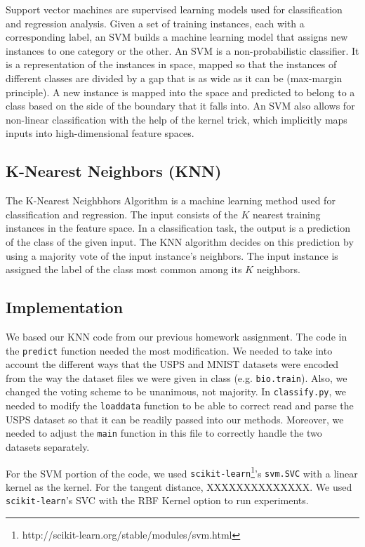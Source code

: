 \documentclass[11pt,letterpaper]{article}
\begin{document}
Support vector machines are supervised learning models used for classification and regression analysis. Given a set of training instances, each with a corresponding label, an SVM builds a machine learning model that assigns new instances to one category or the other. An SVM is a non-probabilistic classifier. It is a representation of the instances in space, mapped so that the instances of different classes are divided by a gap that is as wide as it can be (max-margin principle). A new instance is mapped into the space and predicted to belong to a class based on the side of the boundary that it falls into. An SVM also allows for non-linear classification with the help of the kernel trick, which implicitly maps inputs into high-dimensional feature spaces. 

\subsection{K-Nearest Neighbors (KNN)}

The K-Nearest Neighbhors Algorithm is a machine learning method used for classification and regression. The input consists of the $K$ nearest training instances in the feature space. In a classification task, the output is a prediction of the class of the given input. The KNN algorithm decides on this prediction by using a majority vote of the input instance's neighbors. The input instance is assigned the label of the class most common among its $K$ neighbors.

\subsection{Implementation}

We based our KNN code from our previous homework assignment. The code in the {\tt predict} function needed the most modification. We needed to take into account the different ways that the USPS and MNIST datasets were encoded from the way the dataset files we were given in class (e.g. {\tt bio.train}). Also, we changed the voting scheme to be unanimous, not majority. In {\tt classify.py}, we needed to modify the {\tt load\textunderscore data} function to be able to correct read and parse the USPS dataset so that it can be readily passed into our methods. Moreover, we needed to adjust the {\tt main} function in this file to correctly handle the two datasets separately.


For the SVM portion of the code, we used {\tt scikit-learn}\footnote{http://scikit-learn.org/stable/modules/svm.html}'s {\tt svm.SVC} with a linear kernel as the kernel. For the tangent distance, XXXXXXXXXXXXXX. We used {\tt scikit-learn}'s SVC with the RBF Kernel option to run experiments.
\end{document}
